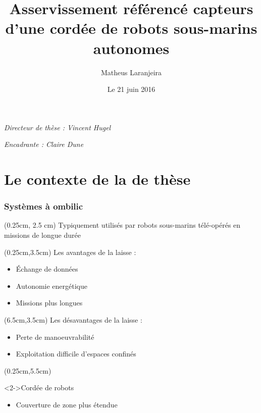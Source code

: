 \documentclass[10pt]{beamer}
\author{Matheus Laranjeira}
\title{Asservissement référencé capteurs d'une cordée de robots sous-marins autonomes}
\date{Le 21 juin 2016}
\begin{document}
\begin{frame}[plain]
\maketitle
\small
{\centering\itshape Directeur de thèse : Vincent Hugel\par}
{\centering\itshape Encadrante : Claire Dune\par}
\end{frame}

\section{Le contexte de la de thèse}

\begin{frame}
\frametitle{Systèmes à ombilic}
\begin{textblock*}{12.3cm}(0.25cm, 2.5 cm) %
Typiquement utilisés par robots sous-marins télé-opérés en missions de longue durée
\end{textblock*}
\begin{textblock*}{6 cm}(0.25cm,3.5cm) %
Les avantages de la laisse :
\begin{itemize}
\item Échange de données \\
\item Autonomie energétique \\
\item Missions plus longues \\
\end{itemize}
\end{textblock*}
\begin{textblock*}{6 cm}(6.5cm,3.5cm) %
Les désavantages de la laisse :
\begin{itemize}
\item Perte de manoeuvrabilité \\
\item Exploitation difficile d'espaces confinés \\
\end{itemize}
\end{textblock*}
\begin{textblock*}{6 cm}(0.25cm,5.5cm) %
\begin{block}<2->{Cordée de robots}
\begin{itemize}
\item Couverture de zone plus étendue \\

\end{itemize}
\end{block}
\end{textblock*}
\end{frame}
\end{document}

